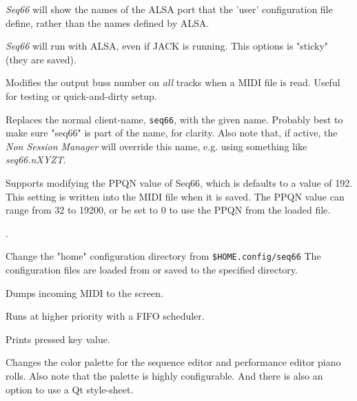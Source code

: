       \textsl{Seq66} will show the names of the ALSA port that the 'user'
      configuration file define, rather than the names defined by ALSA.



      \textsl{Seq66} will run with ALSA, even if JACK is running.
      This options is "sticky" (they are saved).

      Modifies the output buss number on \textsl{all} tracks when a MIDI file is
      read.  Useful for testing or quick-and-dirty setup.

      Replaces the normal client-name, \texttt{seq66}, with the given name.
      Probably best to make sure "seq66" is part of the name, for clarity.
      Also note that, if active, the \textsl{Non Session Manager} will override
      this name, e.g. using something like \textsl{seq66.nXYZT}.

      Supports modifying the PPQN value of Seq66, which is
      defaults to a value of 192.  This setting
      is written into the MIDI file when it is saved.
      The PPQN value can range from 32 to 19200, or
      be set to 0 to use the PPQN from the loaded file.

      .


      Change the "home" configuration directory from \texttt{\$HOME.config/seq66}
      The configuration files are loaded from or saved to the specified directory.

      Dumps incoming MIDI to the screen.

      Runs at higher priority with a FIFO scheduler.


      Prints pressed key value.

      Changes the color palette for the sequence editor and performance editor
      piano rolls.  Also note that the palette is highly configurable.
      And there is also an option to use a Qt style-sheet.


